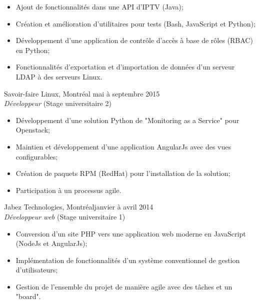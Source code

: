 \documentclass{res}
\begin{document}
\begin{resume}
{	\begin{itemize} \itemsep -2pt
		\item Ajout de fonctionnalités dans une API d'IPTV (Java);
		\item Création et amélioration d'utilitaires pour tests (Bash, JavaScript et Python);
		\item Développement d'une application de contrôle d'accès à base de rôles (RBAC) en Python;
		\item Fonctionnalités d'exportation et d'importation de données d'un serveur LDAP à des serveurs Linux.
	\end{itemize}

	Savoir-faire Linux, Montréal
	\hfill mai à septembre 2015 \\
	{\sl Développeur} \hfill (Stage universitaire 2)
	\vspace{0.05in}

	\begin{itemize} \itemsep -2pt
		\item Développement d'une solution Python de "Monitoring as a Service" pour Openstack;
		\item Maintien et développement d'une application AngularJs avec des vues configurables;
		\item Création de paquets RPM (RedHat) pour l'installation de la solution;
		\item Participation à un processus agile.
	\end{itemize}

	Jabez Technologies, Montréal\footnotemark[\value{footnote}]
	\hfill janvier à avril 2014 \\
	{\sl Développeur web} \hfill (Stage universitaire 1)
	\vspace{0.05in}

	\begin{itemize} \itemsep -2pt
		\item Conversion d’un site PHP vers une application web moderne en JavaScript (NodeJs et AngularJs);
		\item Implémentation de fonctionnalités d’un système conventionnel de gestion d’utilisateurs;
		\item Gestion de l’ensemble du projet de manière agile avec des tâches et un "board".
	\end{itemize}


}
\end{resume}
\end{document}
